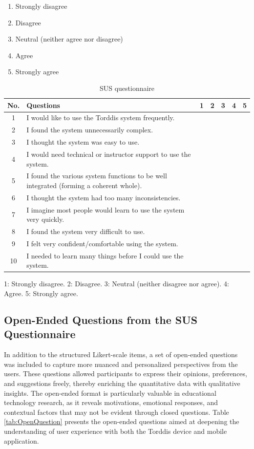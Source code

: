			\begin{enumerate}
				\item Strongly disagree
				\item Disagree
				\item Neutral (neither agree nor disagree)
				\item Agree
				\item Strongly agree
			\end{enumerate}
			
			\begin{table}[h]
				\caption{SUS questionnaire \label{tab:SUSLikertQuestions}}
				\centering
				\begin{tabularx}{\textwidth}{c X c c c c c }
					\toprule
					\textbf{No.} & \textbf{Questions} & 1 & 2 & 3 & 4 & 5 \\
					\midrule
					1 & I would like to use the Torddis system frequently. & & & & & \\
					2 & I found the system unnecessarily complex. & & & & & \\
					3 & I thought the system was easy to use. & & & & & \\
					4 & I would need technical or instructor support to use the system. & & & & & \\
					5 & I found the various system functions to be well integrated (forming a coherent whole). & & & & & \\
					6 & I thought the system had too many inconsistencies. & & & & & \\
					7 & I imagine most people would learn to use the system very quickly. & & & & & \\
					8 & I found the system very difficult to use. & & & & & \\
					9 & I felt very confident/comfortable using the system. & & & & & \\
					10 & I needed to learn many things before I could use the system. & & & & & \\
					\bottomrule
				\end{tabularx}
				\parbox{\textwidth}{\footnotesize 
					1: Strongly disagree. 2: Disagree. 3: Neutral (neither disagree nor agree). 4: Agree. 5: Strongly agree.
				}
			\end{table}
		
		\subsection{Open-Ended Questions from the SUS Questionnaire} \label{Appendix:SUSOpenQuestionarie}
			In addition to the structured Likert-scale items, a set of open-ended questions was included to capture more nuanced and personalized perspectives from the users. These questions allowed participants to express their opinions, preferences, and suggestions freely, thereby enriching the quantitative data with qualitative insights. The open-ended format is particularly valuable in educational technology research, as it reveals motivations, emotional responses, and contextual factors that may not be evident through closed questions. Table \ref{tab:OpenQuestion} presents the open-ended questions aimed at deepening the understanding of user experience with both the Torddis device and mobile application.
			
